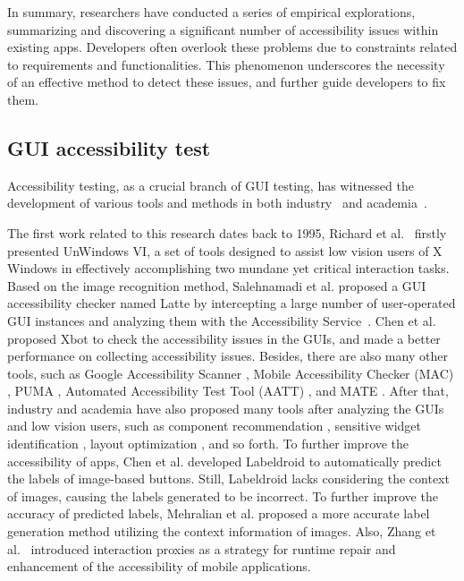 In summary, researchers have conducted a series of empirical explorations, summarizing and discovering a significant number of accessibility issues within existing apps. 
Developers often overlook these problems due to constraints related to requirements and functionalities. 
This phenomenon underscores the necessity of an effective method to detect these issues, and further guide developers to fix them. 

\vspace{-0.42em}
\subsection{GUI accessibility test}
Accessibility testing, as a crucial branch of GUI testing, has witnessed the development of various tools and methods in both industry~\citep{AccessibilityScanner, MobileAccessibilityChecker, AAAT} and academia~\citep{Hao2014PUMAPU, Eler2018AutomatedAT, Zhang2018RobustAO, Oliveira2016AccessibilityOT, Hara2013CombiningCA, Zhang2021ScreenRC}.

The first work related to this research dates back to 1995, Richard et al.~\citep{Kline1995ImprovingGA} firstly presented UnWindows VI, a set of tools designed to assist low vision users of X Windows in effectively accomplishing two mundane yet critical interaction tasks.
Based on the image recognition method, Salehnamadi et al. \citep{Salehnamadi2021LatteUA} proposed a GUI accessibility checker named Latte by intercepting a large number of user-operated GUI instances and analyzing them with the Accessibility Service~\citep{AccessibilityService}.
Chen et al. \citep{Chen2021AccessibleON} proposed Xbot to check the accessibility issues in the GUIs, and made a better performance on collecting accessibility issues.
Besides, there are also many other tools, such as Google Accessibility Scanner \citep{AccessibilityScanner}, Mobile Accessibility Checker (MAC) \citep{MobileAccessibilityChecker}, PUMA \citep{Hao2014PUMAPU}, Automated Accessibility Test Tool (AATT) \citep{AAAT}, and MATE \citep{Eler2018AutomatedAT}.
After that, industry and academia have also proposed many tools after analyzing the GUIs and low vision users, such as component recommendation \citep{Long2020ADA}, sensitive widget identification \citep{Xiao2019IconIntentAI}, layout optimization \citep{Tomlinson2016TalkinAT}, and so forth.
To further improve the accessibility of apps, Chen et al. \citep{Chen2020UnblindYA} developed Labeldroid to automatically predict the labels of image-based buttons.   
Still, Labeldroid lacks considering the context of images, causing the labels generated to be incorrect.
To further improve the accuracy of predicted labels, Mehralian et al. \citep{Mehralian2021DatadrivenAR} proposed a more accurate label generation method utilizing the context information of images.
Also, Zhang et al.~\citep{Zhang2017InteractionPF} introduced interaction proxies as a strategy for runtime repair and enhancement of the accessibility of mobile applications.


